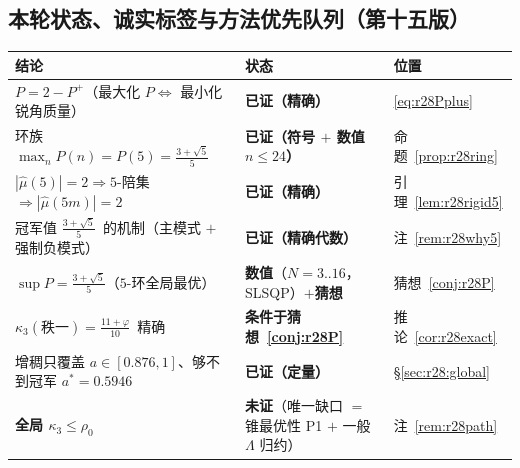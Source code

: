 \documentclass[UTF8,11pt]{ctexart}
\theoremstyle{definition}
\newcommand{\Lam}{\Lambda}
\begin{document}
\subsection{本轮状态、诚实标签与方法优先队列（第十五版）}\label{sec:r28:status}

\begin{center}\small
\begin{tabular}{lll}
\toprule
结论 & 状态 & 位置\\
\midrule
$P=2-P^+$（最大化 $P\iff$ 最小化锐角质量） & \textbf{已证（精确）} & \eqref{eq:r28Pplus}\\
环族 $\max_nP(n)=P(5)=\frac{3+\sqrt5}5$ & \textbf{已证（符号 $+$ 数值 $n\le24$）} & 命题~\ref{prop:r28ring}\\
$|\widehat\mu(5)|=2\Rightarrow5$-陪集 $\Rightarrow|\widehat\mu(5m)|=2$ & \textbf{已证（精确）} & 引理~\ref{lem:r28rigid5}\\
冠军值 $\frac{3+\sqrt5}5$~的机制（主模式 $+$ 强制负模式） & \textbf{已证（精确代数）} & 注~\ref{rem:r28why5}\\
$\sup P=\frac{3+\sqrt5}5$（$5$-环全局最优） & \textbf{数值}（$N=3..16$，SLSQP）$+$\textbf{猜想} & 猜想~\ref{conj:r28P}\\
$\kappa_3(\text{秩一})=\frac{11+\varphi}{10}$~精确 & \textbf{条件于猜想~\ref{conj:r28P}} & 推论~\ref{cor:r28exact}\\
增稠只覆盖 $a\in[0.876,1]$、够不到冠军 $a^*=0.5946$ & \textbf{已证（定量）} & \S\ref{sec:r28:global}\\
\textbf{全局 $\kappa_3\le\rho_0$} & \textbf{未证}（唯一缺口 $=$ 锥最优性 P1 $+$ 一般 $\Lam$ 归约） & 注~\ref{rem:r28path}\\
\bottomrule
\end{tabular}
\end{center}
\end{document}
